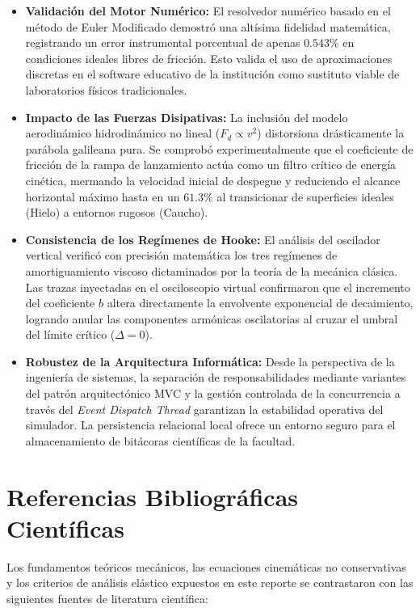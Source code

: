 \documentclass[11pt,a4paper]{article}
\begin{document}
	\begin{itemize}
		\item \textbf{Validación del Motor Numérico:} El resolvedor numérico basado en el método de Euler Modificado demostró una altísima fidelidad matemática, registrando un error instrumental porcentual de apenas $0.543\%$ en condiciones ideales libres de fricción. Esto valida el uso de aproximaciones discretas en el software educativo de la institución como sustituto viable de laboratorios físicos tradicionales.
		\item \textbf{Impacto de las Fuerzas Disipativas:} La inclusión del modelo aerodinámico hidrodinámico no lineal ($F_d \propto v^2$) distorsiona drásticamente la parábola galileana pura. Se comprobó experimentalmente que el coeficiente de fricción de la rampa de lanzamiento actúa como un filtro crítico de energía cinética, mermando la velocidad inicial de despegue y reduciendo el alcance horizontal máximo hasta en un $61.3\%$ al transicionar de superficies ideales (Hielo) a entornos rugosos (Caucho).
		\item \textbf{Consistencia de los Regímenes de Hooke:} El análisis del oscilador vertical verificó con precisión matemática los tres regímenes de amortiguamiento viscoso dictaminados por la teoría de la mecánica clásica. Las trazas inyectadas en el osciloscopio virtual confirmaron que el incremento del coeficiente $b$ altera directamente la envolvente exponencial de decaimiento, logrando anular las componentes armónicas oscilatorias al cruzar el umbral del límite crítico ($\Delta = 0$).
		\item \textbf{Robustez de la Arquitectura Informática:} Desde la perspectiva de la ingeniería de sistemas, la separación de responsabilidades mediante variantes del patrón arquitectónico MVC y la gestión controlada de la concurrencia a través del \textit{Event Dispatch Thread} garantizan la estabilidad operativa del simulador. La persistencia relacional local ofrece un entorno seguro para el almacenamiento de bitácoras científicas de la facultad.
	\end{itemize}
	
	\section{Referencias Bibliográficas Científicas}
	Los fundamentos teóricos mecánicos, las ecuaciones cinemáticas no conservativas y los criterios de análisis elástico expuestos en este reporte se contrastaron con las siguientes fuentes de literatura científica:
	
\end{document}
